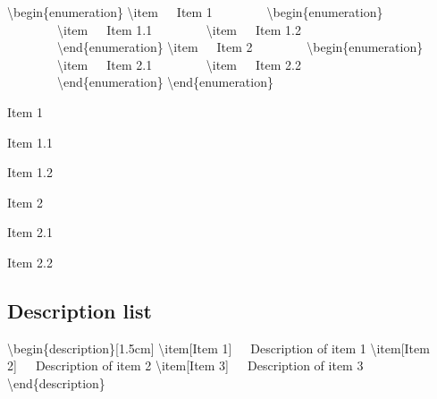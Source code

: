 \documentclass[twoside,openany]{thesis}
\begin{document}
{\ttfamily
    \textbackslash begin\{enumeration\}\linebreak
    \textbackslash item\ \ \ Item 1\linebreak
    \null\ \ \ \ \ \ \ \ \textbackslash begin\{enumeration\}\linebreak
    \null\ \ \ \ \ \ \ \ \textbackslash item\ \ \ Item 1.1\linebreak
    \null\ \ \ \ \ \ \ \ \textbackslash item\ \ \ Item 1.2\linebreak
    \null\ \ \ \ \ \ \ \ \textbackslash end\{enumeration\}\linebreak
    \textbackslash item\ \ \ Item 2\linebreak
    \null\ \ \ \ \ \ \ \ \textbackslash begin\{enumeration\}\linebreak
    \null\ \ \ \ \ \ \ \ \textbackslash item\ \ \ Item 2.1\linebreak
    \null\ \ \ \ \ \ \ \ \textbackslash item\ \ \ Item 2.2\linebreak
    \null\ \ \ \ \ \ \ \ \textbackslash end\{enumeration\}\linebreak
    \textbackslash end\{enumeration\}
}

\begin{enumeration}
\item   Item 1
        \begin{enumeration}
        \item   Item 1.1
        \item   Item 1.2
        \end{enumeration}
\item   Item 2
        \begin{enumeration}
        \item   Item 2.1
        \item   Item 2.2
        \end{enumeration}
\end{enumeration}

\clearpage

\subsection{Description list}\label{subsec:Description list}

{\ttfamily
    \textbackslash begin\{description\}[1.5cm]\linebreak
    \textbackslash item[Item 1]\ \ \ Description of item 1\linebreak
    \textbackslash item[Item 2]\ \ \ Description of item 2\linebreak
    \textbackslash item[Item 3]\ \ \ Description of item 3\linebreak
    \textbackslash end\{description\}
}
\end{document}
